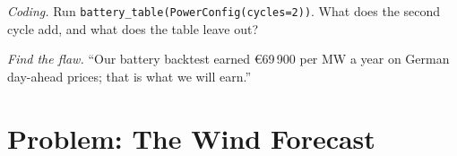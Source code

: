 \begin{exercise}[$\star\star\star$]\label{exo:s2:power-and-gas-trading:7}
\emph{Coding.} Run \texttt{battery\_table(PowerConfig(cycles=2))}. What does the second cycle add, and what does the table leave out?
\end{exercise}

\begin{exercise}[$\star\star\star$]\label{exo:s2:power-and-gas-trading:8}
\emph{Find the flaw.} ``Our battery backtest earned \euro69\,900 per MW a year on German day-ahead prices; that is what we will earn.''
\end{exercise}

\section{Problem: The Wind Forecast}

